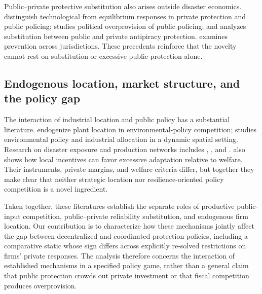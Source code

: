 Public--private protective substitution also arises outside disaster economics. \citet{HickeyEtAl2021} distinguish technological from equilibrium responses in private protection and public policing; \citet{FrieheMungan2022} studies political overprovision of public policing; and \citet{ChoiBaeJun2010} analyzes substitution between public and private antipiracy protection. \citet{LeePinto2009} examines prevention across jurisdictions. These precedents reinforce that the novelty cannot rest on substitution or excessive public protection alone.

\subsection{Endogenous location, market structure, and the policy gap}

The interaction of industrial location and public policy has a substantial literature. \citet{MarkusenMoreyOlewiler1993,MarkusenMoreyOlewiler1995} endogenize plant location in environmental-policy competition; \citet{MartinHerranEtAl2026} studies environmental policy and industrial allocation in a dynamic spatial setting. Research on disaster exposure and production networks includes \citet{OtazawaEtAl2016}, \citet{BacchiocchiEtAl2024}, and \citet{MengDingWang2024}. \citet{HirteEtAl2018} also shows how local incentives can favor excessive adaptation relative to welfare. Their instruments, private margins, and welfare criteria differ, but together they make clear that neither strategic location nor resilience-oriented policy competition is a novel ingredient.

Taken together, these literatures establish the separate roles of productive public-input competition, public--private reliability substitution, and endogenous firm location. Our contribution is to characterize how these mechanisms jointly affect the gap between decentralized and coordinated protection policies, including a comparative static whose sign differs across explicitly re-solved restrictions on firms' private responses. The analysis therefore concerns the interaction of established mechanisms in a specified policy game, rather than a general claim that public protection crowds out private investment or that fiscal competition produces overprovision.
